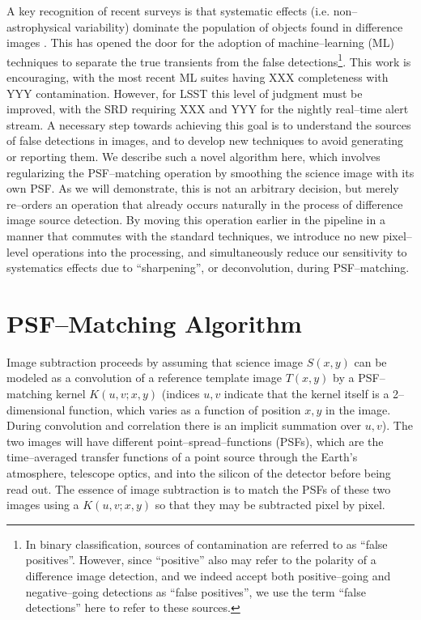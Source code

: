 \documentclass[iop]{emulateapj}
\begin{document}
A key recognition of recent surveys is that systematic effects (i.e. non--astrophysical variability) dominate the population of objects found in difference images \citep{sdss2,panstarrs}.
This has opened the door for the adoption of machine--learning (ML) techniques to separate the true transients from the false detections\footnote{In binary classification, sources of contamination are referred to as ``false positives''.  However, since ``positive'' also may refer to the polarity of a difference image detection, and we indeed accept both positive--going and negative--going detections as ``false positives'', we use the term ``false detections'' here to refer to these sources.}\citep{josh}.
This work is encouraging, with the most recent ML suites having XXX completeness with YYY contamination.
However, for LSST this level of judgment must be improved, with the SRD requiring XXX and YYY for the nightly real--time alert stream.
A necessary step towards achieving this goal is to understand the sources of false detections in images, and to develop new techniques to avoid generating or reporting them.
We describe such a novel algorithm here, which involves regularizing the PSF--matching operation by smoothing the science image with its own PSF.
As we will demonstrate, this is not an arbitrary decision, but merely re--orders an operation that already occurs naturally in the process of difference image source detection.
By moving this operation earlier in the pipeline in a manner that commutes with the standard techniques, we introduce no new pixel--level operations into the processing, and simultaneously reduce our sensitivity to systematics effects due to ``sharpening'', or deconvolution, during PSF--matching.


\section{PSF--Matching Algorithm}

Image subtraction proceeds by assuming that science image $S(x,y)$ can be modeled as a convolution of a reference template image $T(x,y)$ by a PSF--matching kernel $K(u,v;x,y)$ (indices $u,v$ indicate that the kernel itself is a 2--dimensional function, which varies as a function of position $x,y$ in the image.
During convolution and correlation there is an implicit summation over $u,v$).
The two images will have different point--spread--functions (PSFs), which are the time--averaged transfer functions of a point source through the Earth's atmosphere, telescope optics, and into the silicon of the detector before being read out.
The essence of image subtraction is to match the PSFs of these two images using a $K(u,v;x,y)$ so that they may be subtracted pixel by pixel.
\end{document}
